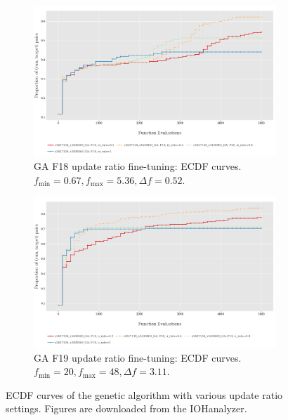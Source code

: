 \documentclass{article}
\begin{document}
\begin{figure}[!ht]
    \begin{subfigure}[h]{0.95\linewidth}
        \includegraphics[width=\linewidth]{ga/f18/urate_ecdf.png}
        \caption{GA F18 update ratio fine-tuning: ECDF curves. $f_{\min} = 0.67, f_{\max} = 5.36, \Delta f = 0.52$.}
    \end{subfigure}
    \hfill
    \begin{subfigure}[h]{0.95\linewidth}
        \includegraphics[width=\linewidth]{ga/f19/urate_ecdf.png}
        \caption{GA F19 update ratio fine-tuning: ECDF curves. $f_{\min} = 20, f_{\max} = 48, \Delta f = 3.11$.}
    \end{subfigure}
    \caption{ECDF curves of the genetic algorithm with various update ratio settings. Figures are downloaded from the IOHanalyzer.}
    \label{fig:experi-ga-urate-ecdf}
\end{figure}
\end{document}
